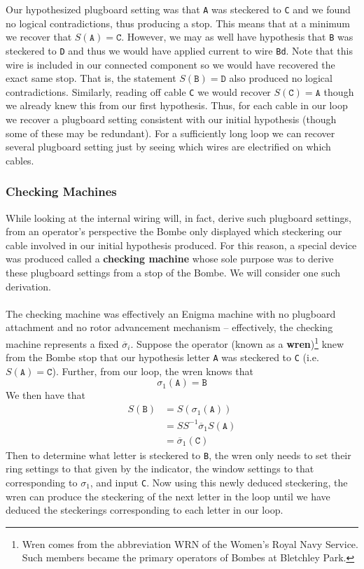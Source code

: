 Our hypothesized plugboard setting was that \texttt{A} was steckered
to \texttt{C} and we found no logical contradictions, thus producing a
stop. This means that at a minimum we recover that $S(\texttt{A}) =
\texttt{C}$. However, we may as well have hypothesis that \texttt{B}
was steckered to \texttt{D} and thus we would have applied current to
wire \texttt{Bd}. Note that this wire is included in our connected
component so we would have recovered the exact same stop. That is,
the statement $S(\texttt{B}) = \texttt{D}$ also produced no logical
contradictions. Similarly, reading off cable \texttt{C} we would
recover $S(\texttt{C}) = \texttt{A}$ though we already knew this from
our first hypothesis. Thus, for each cable in our loop we recover a
plugboard setting consistent with our initial hypothesis (though some
of these may be redundant). For a sufficiently long loop we can
recover several plugboard setting just by seeing which wires are
electrified on which cables.
\subsubsection{Checking Machines}
While looking at the internal wiring will, in fact, derive such
plugboard settings, from an operator's perspective the Bombe only
displayed which steckering our cable involved in our initial
hypothesis produced. For this reason, a special device was produced
called a {\bf{checking machine}} whose sole purpose was to derive
these plugboard settings from a stop of the Bombe. We will consider
one such derivation.
\\\\The checking machine was effectively an Enigma machine with no
plugboard attachment and no rotor advancement mechanism --
effectively, the checking machine represents a fixed
$\overline\sigma_i$. Suppose the operator (known as a
{\bf{wren}})\footnote{Wren comes from the abbreviation WRN of the
  Women's Royal Navy Service. Such members became the primary operators
of Bombes at Bletchley Park.} knew from the Bombe stop that our
hypothesis letter \texttt{A} was steckered to \texttt{C} (i.e.
$S(\texttt{A}) = \texttt{C}$). Further, from our loop, the wren knows that
\[
  \sigma_1(\texttt{A}) = \texttt{B}
\]
We then have that
\begin{align*}
  S(\texttt{B}) & = S(\sigma_1(\texttt{A}))                \\
  & = SS^{-1}\overline\sigma_1 S(\texttt{A}) \\
  & = \overline\sigma_1(\texttt{C})
\end{align*}
Then to determine what letter is steckered to \texttt{B}, the wren
only needs to set their ring settings to that given by the indicator,
the window settings to that corresponding to $\sigma_1$, and input
\texttt{C}. Now using this newly deduced steckering, the wren can
produce the steckering of the next letter in the loop until we have
deduced the steckerings corresponding to each letter in our loop.

